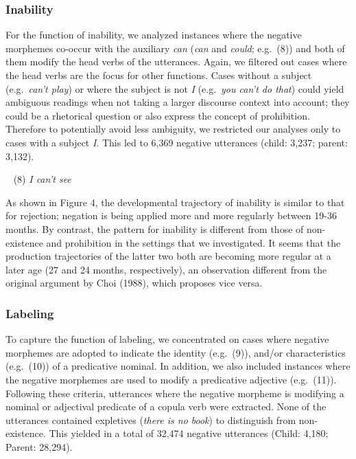\documentclass[10pt, letterpaper]{article}
\begin{document}
\hypertarget{inability}{%
\subsubsection{Inability}\label{inability}}

For the function of inability, we analyzed instances where the negative
morphemes co-occur with the auxiliary \emph{can} (\emph{can} and
\emph{could}; e.g.~(8)) and both of them modify the head verbs of the
utterances. Again, we filtered out cases where the head verbs are the
focus for other functions. Cases without a subject (e.g.~\emph{can't
play}) or where the subject is not \emph{I} (e.g.~\emph{you can't do
that}) could yield ambiguous readings when not taking a larger discourse
context into account; they could be a rhetorical question or also
express the concept of prohibition. Therefore to potentially avoid less
ambiguity, we restricted our analyses only to cases with a subject
\emph{I}. This led to 6,369 negative utterances (child: 3,237; parent:
3,132).

~ (8) \emph{I can't see}

As shown in Figure 4, the developmental trajectory of inability is
similar to that for rejection; negation is being applied more and more
regularly between 19-36 months. By contrast, the pattern for inability
is different from those of non-existence and prohibition in the settings
that we investigated. It seems that the production trajectories of the
latter two both are becoming more regular at a later age (27 and 24
months, respectively), an observation different from the original
argument by Choi (1988), which proposes vice versa.

\hypertarget{labeling}{%
\subsubsection{Labeling}\label{labeling}}

To capture the function of labeling, we concentrated on cases where
negative morphemes are adopted to indicate the identity (e.g.~(9)),
and/or characteristics (e.g.~(10)) of a predicative nominal. In
addition, we also included instances where the negative morphemes are
used to modify a predicative adjective (e.g.~(11)). Following these
criteria, utterances where the negative morpheme is modifying a nominal
or adjectival predicate of a copula verb were extracted. None of the
utterances contained expletives (\emph{there is no book}) to distinguish
from non-existence. This yielded in a total of 32,474 negative
utterances (Child: 4,180; Parent: 28,294).
\end{document}
